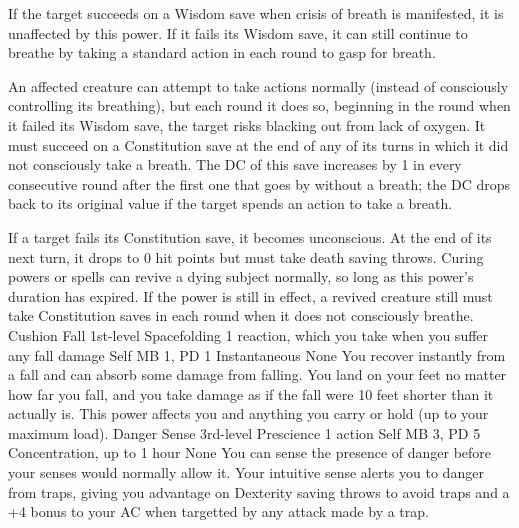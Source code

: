 If the target succeeds on a Wisdom save when crisis of breath
is manifested, it is unaffected by this power. If it fails
its Wisdom save, it can still continue to breathe by taking
a standard action in each round to gasp for breath.

An affected creature can attempt to take actions normally
(instead of consciously controlling its breathing), but each
round it does so, beginning in the round when it failed its
Wisdom save, the target risks blacking out from lack of oxygen.
It must succeed on a Constitution save at the end of any of
its turns in which it did not consciously take a breath. The
DC of this save increases by 1 in every consecutive round
after the first one that goes by without a breath; the DC
drops back to its original value if the target spends an action
to take a breath.

If a target fails its Constitution save, it becomes unconscious.
At the end of its next turn, it drops to 0 hit points but
must take death saving throws. Curing powers or spells can
revive a dying subject normally, so long as this power's
duration has expired.
If the power is still in effect, a revived
creature still must take Constitution saves in each round
when it does not consciously breathe.
\DndPowerHeader%
    {Cushion Fall\label{pwr:cushion-fall}}
    {1st-level Spacefolding}
    {1 reaction, which you take when you suffer any fall damage}
    {Self}
    {MB 1, PD 1}
    {Instantaneous}
    {None}
You recover instantly from a fall and can
absorb some damage from falling. You land on your feet no
matter how far you fall, and you take damage as if the fall
were 10 feet shorter than it actually is. This power affects
you and anything you carry or hold (up to your maximum load).
\DndPowerHeader%
    {Danger Sense\label{pwr:danger-sense}}
    {3rd-level Prescience}
    {1 action}
    {Self}
    {MB 3, PD 5}
    {Concentration, up to 1 hour}
    {None}
You can sense the presence of danger before
your senses would normally allow it. Your intuitive sense
alerts you to danger from traps, giving you advantage on Dexterity
saving throws to avoid traps and a +4 bonus to your AC when
targetted by any attack made by a trap.

